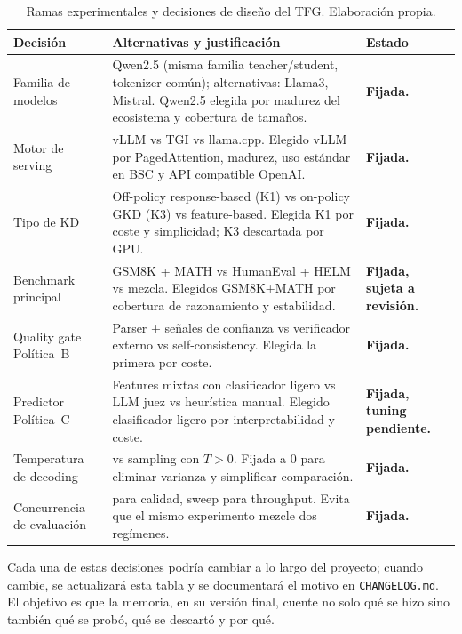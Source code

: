 \documentclass[11pt,a4paper]{article}
\begin{document}
\begin{table}[H]
\centering
\caption{Ramas experimentales y decisiones de diseño del TFG. Elaboración propia.}
\label{tab:ramas}
\footnotesize
\begin{tabularx}{\textwidth}{>{\raggedright\arraybackslash}p{3cm} >{\raggedright\arraybackslash}X >{\raggedright\arraybackslash}p{3cm}}
\toprule
\textbf{Decisión} & \textbf{Alternativas y justificación} & \textbf{Estado} \\
\midrule
Familia de modelos & Qwen2.5 (misma familia teacher/student, tokenizer común); alternativas: Llama3, Mistral. Qwen2.5 elegida por madurez del ecosistema y cobertura de tamaños. & \textbf{Fijada.} \\
\addlinespace
Motor de serving & vLLM vs TGI vs llama.cpp. Elegido vLLM por PagedAttention, madurez, uso estándar en BSC y API compatible OpenAI. & \textbf{Fijada.} \\
\addlinespace
Tipo de KD & Off-policy response-based (K1) vs on-policy GKD (K3) vs feature-based. Elegida K1 por coste y simplicidad; K3 descartada por GPU. & \textbf{Fijada.} \\
\addlinespace
Benchmark principal & GSM8K + MATH vs HumanEval + HELM vs mezcla. Elegidos GSM8K+MATH por cobertura de razonamiento y estabilidad. & \textbf{Fijada, sujeta a revisión.} \\
\addlinespace
Quality gate Política~B & Parser + señales de confianza vs verificador externo vs self-consistency. Elegida la primera por coste. & \textbf{Fijada.} \\
\addlinespace
Predictor Política~C & Features mixtas con clasificador ligero vs LLM juez vs heurística manual. Elegido clasificador ligero por interpretabilidad y coste. & \textbf{Fijada, tuning pendiente.} \\
\addlinespace
Temperatura de decoding & 0 vs sampling con $T>0$. Fijada a 0 para eliminar varianza y simplificar comparación. & \textbf{Fijada.} \\
\addlinespace
Concurrencia de evaluación & 1 para calidad, sweep para throughput. Evita que el mismo experimento mezcle dos regímenes. & \textbf{Fijada.} \\
\bottomrule
\end{tabularx}
\end{table}

Cada una de estas decisiones podría cambiar a lo largo del proyecto; cuando cambie, se actualizará esta tabla y se documentará el motivo en \texttt{CHANGELOG.md}. El objetivo es que la memoria, en su versión final, cuente no solo qué se hizo sino también qué se probó, qué se descartó y por qué.
\end{document}
